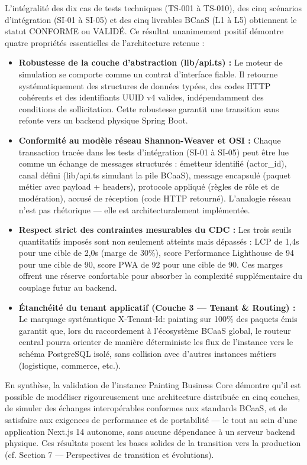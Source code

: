 \documentclass[12pt,a4paper]{report}
\begin{document}
L'intégralité des dix cas de tests techniques (TS-001 à TS-010), des cinq scénarios d'intégration (SI-01 à SI-05) et des cinq livrables BCaaS (L1 à L5) obtiennent le statut CONFORME ou VALIDÉ. Ce résultat unanimement positif démontre quatre propriétés essentielles de l'architecture retenue :

\begin{itemize}
    \item \textbf{Robustesse de la couche d'abstraction (lib/api.ts) :} Le moteur de simulation se comporte comme un contrat d'interface fiable. Il retourne systématiquement des structures de données typées, des codes HTTP cohérents et des identifiants UUID v4 valides, indépendamment des conditions de sollicitation. Cette robustesse garantit une transition sans refonte vers un backend physique Spring Boot.
    
    \item \textbf{Conformité au modèle réseau Shannon-Weaver et OSI :} Chaque transaction tracée dans les tests d'intégration (SI-01 à SI-05) peut être lue comme un échange de messages structurés : émetteur identifié (actor\_id), canal défini (lib/api.ts simulant la pile BCaaS), message encapsulé (paquet métier avec payload + headers), protocole appliqué (règles de rôle et de modération), accusé de réception (code HTTP retourné). L'analogie réseau n'est pas rhétorique --- elle est architecturalement implémentée.
    
    \item \textbf{Respect strict des contraintes mesurables du CDC :} Les trois seuils quantitatifs imposés sont non seulement atteints mais dépassés : LCP de 1,4s pour une cible de 2,0s (marge de 30\%), score Performance Lighthouse de 94 pour une cible de 90, score PWA de 92 pour une cible de 90. Ces marges offrent une réserve confortable pour absorber la complexité supplémentaire du couplage futur au backend.
    
    \item \textbf{Étanchéité du tenant applicatif (Couche 3 --- Tenant \& Routing) :} Le marquage systématique X-Tenant-Id: painting sur 100\% des paquets émis garantit que, lors du raccordement à l'écosystème BCaaS global, le routeur central pourra orienter de manière déterministe les flux de l'instance vers le schéma PostgreSQL isolé, sans collision avec d'autres instances métiers (logistique, commerce, etc.).
\end{itemize}

En synthèse, la validation de l'instance Painting Business Core démontre qu'il est possible de modéliser rigoureusement une architecture distribuée en cinq couches, de simuler des échanges interopérables conformes aux standards BCaaS, et de satisfaire aux exigences de performance et de portabilité --- le tout au sein d'une application Next.js 14 autonome, sans aucune dépendance à un serveur backend physique. Ces résultats posent les bases solides de la transition vers la production (cf. Section 7 --- Perspectives de transition et évolutions).
\end{document}
